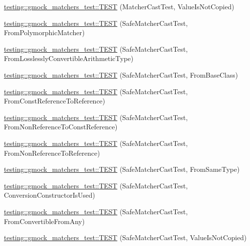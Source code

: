 \begin{DoxyCompactItemize}
\hyperlink{namespacetesting_1_1gmock__matchers__test_ae99c08c8a815964b61f98a4785cf79b5}{testing\+::gmock\+\_\+matchers\+\_\+test\+::\+T\+E\+ST} (Matcher\+Cast\+Test, Value\+Is\+Not\+Copied)
\item 
\hyperlink{namespacetesting_1_1gmock__matchers__test_a29c04361c022a71711dbf9d3cf2a5050}{testing\+::gmock\+\_\+matchers\+\_\+test\+::\+T\+E\+ST} (Safe\+Matcher\+Cast\+Test, From\+Polymorphic\+Matcher)
\item 
\hyperlink{namespacetesting_1_1gmock__matchers__test_a70bbe53742db988a828d9e8201e34770}{testing\+::gmock\+\_\+matchers\+\_\+test\+::\+T\+E\+ST} (Safe\+Matcher\+Cast\+Test, From\+Losslessly\+Convertible\+Arithmetic\+Type)
\item 
\hyperlink{namespacetesting_1_1gmock__matchers__test_a937469149aee65efde526091af1e4f78}{testing\+::gmock\+\_\+matchers\+\_\+test\+::\+T\+E\+ST} (Safe\+Matcher\+Cast\+Test, From\+Base\+Class)
\item 
\hyperlink{namespacetesting_1_1gmock__matchers__test_a14ba7c67551222321056e4da6708010f}{testing\+::gmock\+\_\+matchers\+\_\+test\+::\+T\+E\+ST} (Safe\+Matcher\+Cast\+Test, From\+Const\+Reference\+To\+Reference)
\item 
\hyperlink{namespacetesting_1_1gmock__matchers__test_ad53741423311d4f76d9d980f59ec8d65}{testing\+::gmock\+\_\+matchers\+\_\+test\+::\+T\+E\+ST} (Safe\+Matcher\+Cast\+Test, From\+Non\+Reference\+To\+Const\+Reference)
\item 
\hyperlink{namespacetesting_1_1gmock__matchers__test_a362ce5b2b395dfd6363e4d80b49951f1}{testing\+::gmock\+\_\+matchers\+\_\+test\+::\+T\+E\+ST} (Safe\+Matcher\+Cast\+Test, From\+Non\+Reference\+To\+Reference)
\item 
\hyperlink{namespacetesting_1_1gmock__matchers__test_a9fc149b429176a45e45267132ae901bd}{testing\+::gmock\+\_\+matchers\+\_\+test\+::\+T\+E\+ST} (Safe\+Matcher\+Cast\+Test, From\+Same\+Type)
\item 
\hyperlink{namespacetesting_1_1gmock__matchers__test_aa608f074e26876d41333cd265c4ca008}{testing\+::gmock\+\_\+matchers\+\_\+test\+::\+T\+E\+ST} (Safe\+Matcher\+Cast\+Test, Conversion\+Constructor\+Is\+Used)
\item 
\hyperlink{namespacetesting_1_1gmock__matchers__test_a0490279eed67f8fa45f83c4951e1d8a1}{testing\+::gmock\+\_\+matchers\+\_\+test\+::\+T\+E\+ST} (Safe\+Matcher\+Cast\+Test, From\+Convertible\+From\+Any)
\item 
\hyperlink{namespacetesting_1_1gmock__matchers__test_ac82f8355af7a1e6ba3b67ba8423a1d73}{testing\+::gmock\+\_\+matchers\+\_\+test\+::\+T\+E\+ST} (Safe\+Matcher\+Cast\+Test, Value\+Is\+Not\+Copied)

\end{DoxyCompactItemize}
